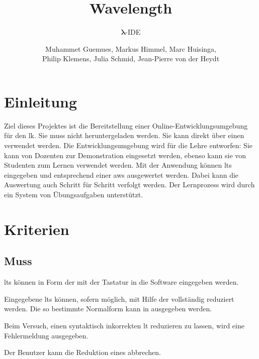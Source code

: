 \documentclass[parskip=full,11pt,twoside]{scrartcl}
\title{Wavelength}
\subtitle{$\bm{\lambda}$-IDE}
\author{Muhammet Guemues, Markus Himmel, Marc Huisinga,\\Philip Klemens, Julia Schmid, Jean-Pierre von der Heydt}
\begin{document}
\maketitle
\pagebreak

\tableofcontents
\pagebreak

\section{Einleitung}
Ziel dieses Projektes ist die Bereitstellung einer Online-Entwicklungsumgebung für den \gls{lk}. 
Sie muss nicht heruntergeladen werden.
Sie kann direkt über einen  verwendet werden.
Die Entwicklungsumgebung wird für die Lehre entworfen: 
Sie kann von Dozenten zur Demonstration eingesetzt werden, ebenso kann sie von Studenten zum Lernen verwendet werden.
Mit der Anwendung können \glspl{lt} eingegeben und entsprechend einer \gls{aws} ausgewertet werden.
Dabei kann die Auswertung auch Schritt für Schritt verfolgt werden.
Der Lernprozess wird durch ein System von Übungsaufgaben unterstützt.

\pagebreak
\section{Kriterien}

\subsection{Muss}

\glspl{lt} können in Form der 
mit der Tastatur in die Software eingegeben werden.

Eingegebene \glspl{lt} können, sofern möglich, mit Hilfe der  vollständig
reduziert werden. Die so bestimmte Normalform kann in 
ausgegeben werden.

Beim Versuch, einen syntaktisch inkorrekten \gls{lt} reduzieren zu lassen, wird eine
Fehlermeldung ausgegeben.

Der Benutzer kann die Reduktion eines  abbrechen.
\end{document}
